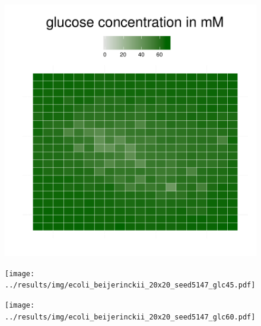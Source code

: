 \begin{figure}[h!]
{\begin{minipage}[t]{0.3\textwidth}
    \includegraphics[width=\textwidth]{../results/img/ecoli_beijerinckii_20x20_seed5147_glc25.pdf}
  \end{minipage}
  \begin{minipage}[t]{0.3\textwidth}
    \texttt{[image: ../results/img/ecoli\_beijerinckii\_20x20\_seed5147\_glc45.pdf]}
  \end{minipage}
  \begin{minipage}[t]{0.3\textwidth}
    \texttt{[image: ../results/img/ecoli\_beijerinckii\_20x20\_seed5147\_glc60.pdf]}
  \end{minipage}
  }
\end{figure}
